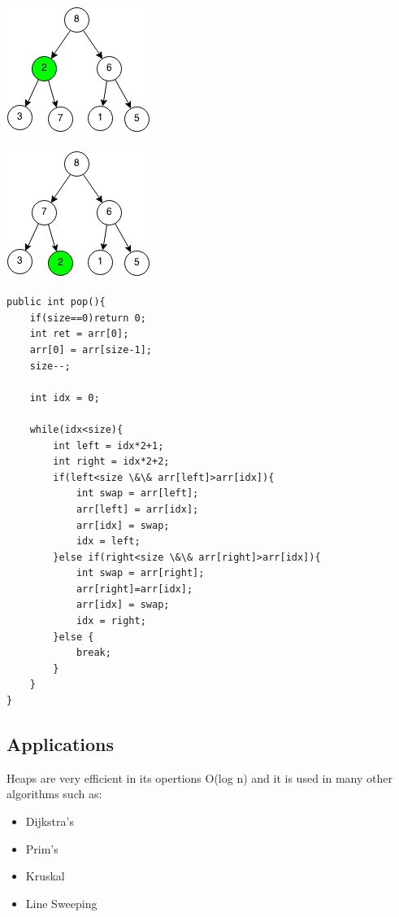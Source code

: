 \documentclass[11pt,oneside]{book}
\makeatletter
\def\maxwidth#1{\ifdim\Gin@nat@width>#1 #1\else\Gin@nat@width\fi}
\makeatother
\begin{document}
\includegraphics[width=\maxwidth{\textwidth}]{maxheappop2.png}

\includegraphics[width=\maxwidth{\textwidth}]{maxheappop3.png}

\begin{lstlisting}
public int pop(){
    if(size==0)return 0;
    int ret = arr[0];
    arr[0] = arr[size-1];
    size--;
        
    int idx = 0;
        
    while(idx<size){
        int left = idx*2+1;
        int right = idx*2+2;
        if(left<size \&\& arr[left]>arr[idx]){
            int swap = arr[left];
            arr[left] = arr[idx];
            arr[idx] = swap;
            idx = left;
        }else if(right<size \&\& arr[right]>arr[idx]){
            int swap = arr[right];
            arr[right]=arr[idx];
            arr[idx] = swap;
            idx = right;
        }else {
            break;
        }
    }
}
\end{lstlisting}

\subsection{Applications}

Heaps are very efficient in its opertions O(log n) and it is used in many other algorithms such as:

\begin{itemize}
\item Dijkstra's
\item Prim's
\item Kruskal
\item Line Sweeping
\end{itemize}
\end{document}
